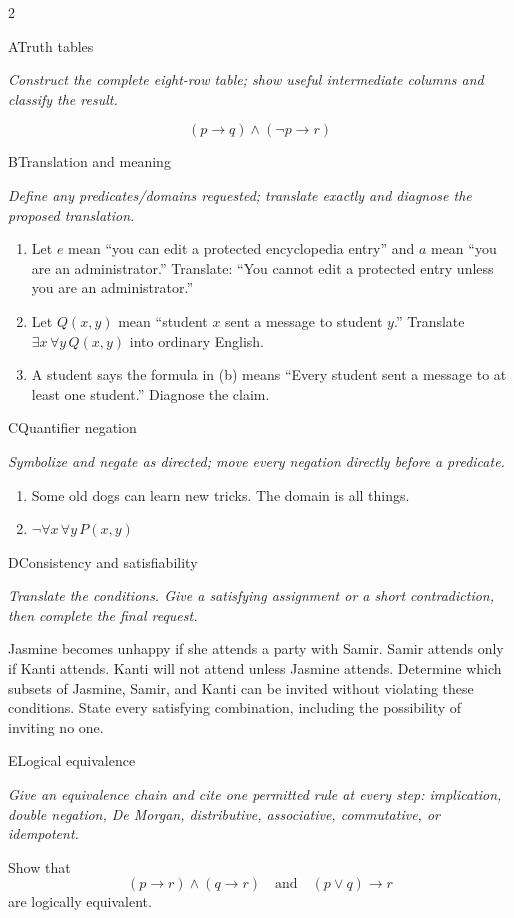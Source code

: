 \documentclass[9pt]{extarticle}
\begin{document}
\begin{multicols}{2}
\begin{CoreProblem}{A}{Truth tables}
{\scriptsize\textit{Construct the complete eight-row table; show useful intermediate columns and classify the result.}\par}
\[
  (p\to q)\land(\neg p\to r)
\]
\end{CoreProblem}
\begin{CoreProblem}{B}{Translation and meaning}
{\scriptsize\textit{Define any predicates/domains requested; translate exactly and diagnose the proposed translation.}\par}
\begin{enumerate}[label=(\alph*)]
  \item Let $e$ mean ``you can edit a protected encyclopedia entry'' and $a$
        mean ``you are an administrator.'' Translate: ``You cannot edit a
        protected entry unless you are an administrator.''
  \item Let $Q(x,y)$ mean ``student $x$ sent a message to student $y$.''
        Translate $\exists x\,\forall y\,Q(x,y)$ into ordinary English.
  \item A student says the formula in (b) means ``Every student sent a message
        to at least one student.'' Diagnose the claim.
\end{enumerate}
\end{CoreProblem}
\begin{CoreProblem}{C}{Quantifier negation}
{\scriptsize\textit{Symbolize and negate as directed; move every negation directly before a predicate.}\par}
\begin{enumerate}[label=(\alph*)]
  \item Some old dogs can learn new tricks. The domain is all things.
  \item $\neg\forall x\,\forall y\,P(x,y)$
\end{enumerate}
\end{CoreProblem}
\columnbreak
\begin{CoreProblem}{D}{Consistency and satisfiability}
{\scriptsize\textit{Translate the conditions. Give a satisfying assignment or a short contradiction, then complete the final request.}\par}
Jasmine becomes unhappy if she attends a party with Samir. Samir attends only
if Kanti attends. Kanti will not attend unless Jasmine attends. Determine which
subsets of Jasmine, Samir, and Kanti can be invited without violating these
conditions. State every satisfying combination, including the possibility of
inviting no one.
\end{CoreProblem}
\begin{CoreProblem}{E}{Logical equivalence}
{\scriptsize\textit{Give an equivalence chain and cite one permitted rule at every step: implication, double negation, De Morgan, distributive, associative, commutative, or idempotent.}\par}
Show that
\[
  (p\to r)\land(q\to r)
  \quad\text{and}\quad
  (p\lor q)\to r
\]
are logically equivalent.
\end{CoreProblem}
\end{multicols}
\end{document}
